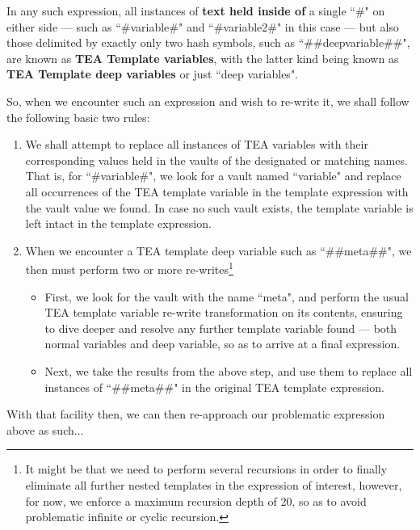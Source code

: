 \documentclass[a4paper, 18pt]{book} %
\begin{document}
{{{\vspace{2em}

In any such expression, all instances of \textbf{text held inside of} a single ``\#" on either side --- such as ``\#variable\#" and ``\#variable2\#" in this case --- but also those  delimited by exactly only two hash symbols, such as ``\#\#deepvariable\#\#", are known as \textbf{TEA Template variables}, with the latter kind being known as \textbf{TEA Template deep variables} or just ``deep variables".

\vspace{2em}

So, when we encounter such an expression and wish to re-write it, we shall follow the following basic two rules:

\begin{enumerate}
\item We shall attempt to replace all instances of TEA variables with their corresponding values held in the vaults of the designated or matching names. That is, for ``\#variable\#", we look for a vault named ``variable" and replace all occurrences of the TEA template variable in the template expression with the vault value we found. In case no such vault exists, the template variable is left intact in the template expression.
\item{When we encounter a TEA template deep variable such as ``\#\#meta\#\#", we then must perform two or more re-writes\footnote{It might be that we need to perform several recursions in order to finally eliminate all further nested templates in the expression of interest, however, for now, we enforce a maximum recursion depth of 20, so as to avoid problematic infinite or cyclic recursion.}
\begin{itemize}
\item First, we look for the vault with the name ``meta", and perform the usual TEA template variable re-write transformation on its contents, ensuring to dive deeper and resolve any further template variable found --- both normal variables and deep variable, so as to arrive at a final expression.
\item Next, we take the results from the above step, and use them to replace all instances of ``\#\#meta\#\#" in the original TEA template expression.
\end{itemize}
}
\end{enumerate}

\vspace{2em}

With that facility then, we can then re-approach our problematic expression above as such...

}}}
\end{document}

